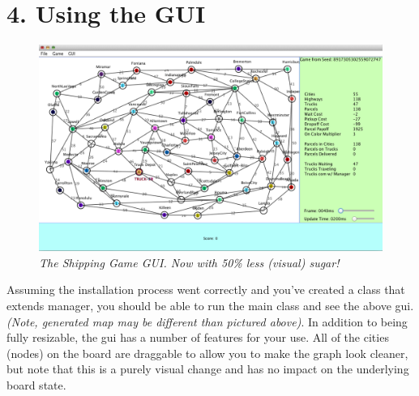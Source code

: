 \documentclass[11pt]{article}
\begin{document}
\section{4. Using the GUI}
\begin{figure}[h]
\centerline{\includegraphics[scale=0.45]{gui.png}} 
\caption{\em{The Shipping Game GUI. Now with 50\% less (visual) sugar!}}
\end{figure}

Assuming the installation process went correctly and you've created a class that
extends manager, you should be able to run the main class and see the above gui.
{\em(Note, generated map may be different than pictured above)}. In addition to
being fully resizable, the gui has a number of features for your use. All of the
cities (nodes) on the board are draggable to allow you to make the graph look
cleaner, but note that this is a purely visual change and has no impact on the
underlying board state.
\end{document}
